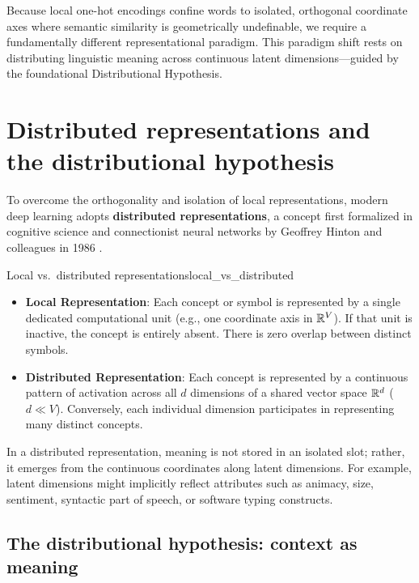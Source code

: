 \documentclass[../../main.tex]{subfiles}
\begin{document}
Because local one-hot encodings confine words to isolated, orthogonal coordinate axes where semantic similarity is geometrically undefinable, we require a fundamentally different representational paradigm. This paradigm shift rests on distributing linguistic meaning across continuous latent dimensions---guided by the foundational Distributional Hypothesis.

\section{Distributed representations and the distributional hypothesis}
\label{sec:distributed_representations}

To overcome the orthogonality and isolation of local representations, modern deep learning adopts \textbf{distributed representations}, a concept first formalized in cognitive science and connectionist neural networks by Geoffrey Hinton and colleagues in 1986 \cite{rumelhart1986}.

\begin{definition}{Local vs.~distributed representations}{local_vs_distributed}
\begin{itemize}
    \item \textbf{Local Representation}: Each concept or symbol is represented by a single dedicated computational unit (e.g., one coordinate axis in $\mathbb{R}^V$). If that unit is inactive, the concept is entirely absent. There is zero overlap between distinct symbols.
    \item \textbf{Distributed Representation}: Each concept is represented by a continuous pattern of activation across all $d$ dimensions of a shared vector space $\mathbb{R}^d$ ($d \ll V$). Conversely, each individual dimension participates in representing many distinct concepts.
\end{itemize}
\end{definition}

In a distributed representation, meaning is not stored in an isolated slot; rather, it emerges from the continuous coordinates along latent dimensions. For example, latent dimensions might implicitly reflect attributes such as animacy, size, sentiment, syntactic part of speech, or software typing constructs.

\subsection{The distributional hypothesis: context as meaning}
\label{subsec:distributional_hypothesis}
\end{document}
